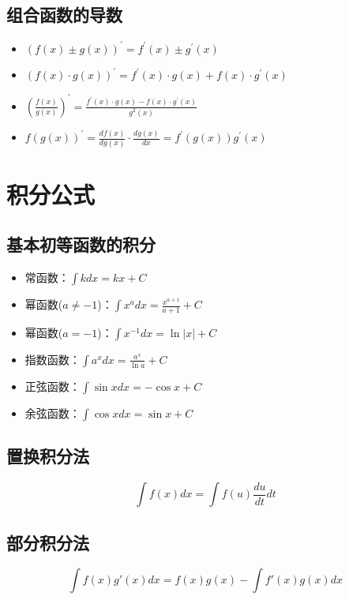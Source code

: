 \subsection{组合函数的导数}

\begin{itemize}
    \item $(f(x)\pm g(x))^\prime=f^\prime(x)\pm g^\prime(x)$
    \item $(f(x)\cdot g(x))^\prime=f^\prime(x)\cdot g(x)+f(x)\cdot g^\prime(x)$
    \item $(\frac{f(x)}{g(x)})^\prime=\frac{f^\prime(x)\cdot g(x)-f(x)\cdot g^\prime(x)}{g^2(x)}$
    \item $f(g(x))^\prime=\frac{df(x)}{dg(x)}\cdot\frac{dg(x)}{dx}=f^\prime(g(x))g^\prime(x)$
\end{itemize}

\section{积分公式}

\subsection{基本初等函数的积分}

\begin{itemize}
    \item 常函数：$\int kdx=kx+C$
    \item 幂函数($a\neq-1$)：$\int x^adx=\frac{x^{a+1}}{a+1}+C$
    \item 幂函数($a=-1$)：$\int x^{-1}dx=\ln|x|+C$
    \item 指数函数：$\int a^xdx=\frac{a^x}{\ln a}+C$
    \item 正弦函数：$\int\sin xdx=-\cos x+C$
    \item 余弦函数：$\int\cos xdx=\sin x+C$
\end{itemize}

\subsection{置换积分法}

\begin{equation*}
    \int f(x)dx=\int f(u)\frac{du}{dt}dt
\end{equation*}

\subsection{部分积分法}

\begin{equation*}
    \int f(x)g'(x)dx=f(x)g(x)-\int f'(x)g(x)dx
\end{equation*}
